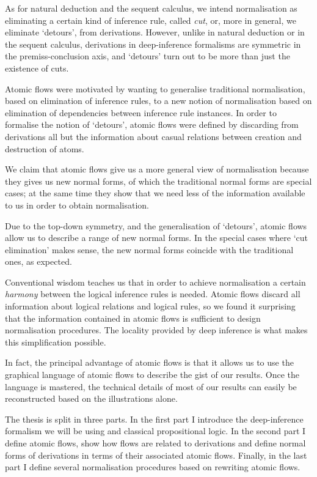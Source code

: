 As for natural deduction and the sequent calculus, we intend normalisation as eliminating a certain kind of inference rule, called \emph{cut}, or, more in general, we eliminate `detours', from derivations. However, unlike in natural deduction or in the sequent calculus, derivations in deep-inference formalisms are symmetric in the premiss-conclusion axis, and `detours' turn out to be more than just the existence of cuts.

Atomic flows were motivated by wanting to generalise traditional normalisation, based on elimination of inference rules, to a new notion of normalisation based on elimination of dependencies between inference rule instances. In order to formalise the notion of `detours', atomic flows were defined by discarding from derivations all but the information about casual relations between creation and destruction of atoms.

We claim that atomic flows give us a more general view of normalisation because they gives us new normal forms, of which the traditional normal forms are special cases; at the same time they show that we need less of the information available to us in order to obtain normalisation.

Due to the top-down symmetry, and the generalisation of `detours', atomic flows allow us to describe a range of new normal forms. In the special cases where `cut elimination' makes sense, the new normal forms coincide with the traditional ones, as expected.

Conventional wisdom teaches us that in order to achieve normalisation a certain \emph{harmony} between the logical inference rules is needed. Atomic flows discard all information about logical relations and logical rules, so we found it surprising that the information contained in atomic flows is sufficient to design normalisation procedures. The locality provided by deep inference is what makes this simplification possible.

In fact, the principal advantage of atomic flows is that it allows us to use the graphical language of atomic flows to describe the gist of our results. Once the language is mastered, the technical details of most of our results can easily be reconstructed based on the illustrations alone.

The thesis is split in three parts. In the first part I introduce the deep-inference formalism we will be using and classical propositional logic. In the second part I define atomic flows, show how flows are related to derivations and define normal forms of derivations in terms of their associated atomic flows. Finally, in the last part I define several normalisation procedures based on rewriting atomic flows.